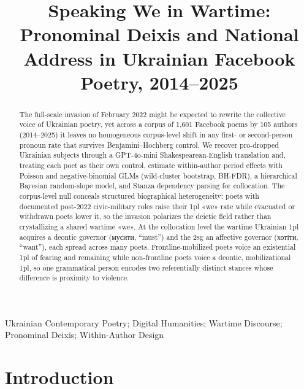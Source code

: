 \documentclass[12pt]{interact}
\theoremstyle{plain}%
\theoremstyle{definition}
\theoremstyle{remark}
\begin{document}

\title{Speaking We in Wartime: Pronominal Deixis and National Address in Ukrainian Facebook Poetry, 2014–2025}

\author{
}

\maketitle

\begin{abstract}
The full-scale invasion of February 2022 might be expected to rewrite the collective voice of Ukrainian poetry, yet across a corpus of 1{,}601 Facebook poems by 105 authors (2014--2025) it leaves no homogeneous corpus-level shift in any first- or second-person pronoun rate that survives Benjamini--Hochberg control. We recover pro-dropped Ukrainian subjects through a GPT-4o-mini Shakespearean-English translation and, treating each poet as their own control, estimate within-author period effects with Poisson and negative-binomial GLMs (wild-cluster bootstrap, BH-FDR), a hierarchical Bayesian random-slope model, and Stanza dependency parsing for collocation. The corpus-level null conceals structured biographical heterogeneity: poets with documented post-2022 civic-military roles raise their 1pl «we» rate while evacuated or withdrawn poets lower it, so the invasion polarizes the deictic field rather than crystallizing a shared wartime «we». At the collocation level the wartime Ukrainian 1pl acquires a deontic governor (\textukrainian{мусити}, ``must'') and the 2sg an affective governor (\textukrainian{хотіти}, ``want''), each spread across many poets. Frontline-mobilized poets voice an existential 1pl of fearing and remaining while non-frontline poets voice a deontic, mobilizational 1pl, so one grammatical person encodes two referentially distinct stances whose difference is proximity to violence.
\end{abstract}

\begin{keywords}
Ukrainian Contemporary Poetry; Digital Humanities; Wartime Discourse; Pronominal Deixis; Within-Author Design
\end{keywords}

\section{Introduction}
\end{document}

